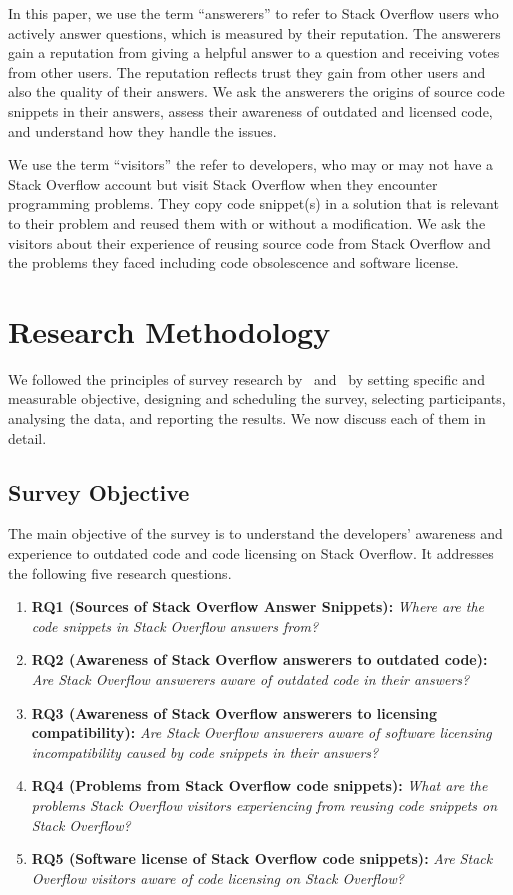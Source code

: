 \documentclass{svjour3}                     %
\begin{document}
In this paper, we use the term ``answerers'' to refer to Stack Overflow users
who actively answer questions, which is measured by their reputation. The
answerers gain a reputation from giving a helpful answer to a question and
receiving votes from other users. The reputation reflects trust they gain from
other users and also the quality of their answers. We ask the answerers the
origins of source code snippets in their answers, assess their awareness of
outdated and licensed code, and understand how they handle the issues.

We use the term ``visitors'' the refer to developers, who may or may not have a
Stack Overflow account but visit Stack Overflow when they encounter programming
problems. They copy code snippet(s) in a solution that is relevant to their
problem and reused them with or without a modification. We ask the visitors
about their experience of reusing source code from Stack Overflow and the
problems they faced including code obsolescence and software license.

\section{Research Methodology}
We followed the principles of survey research by~\cite{Pfleeger2001}
and~\cite{Kitchenham2002} by setting specific and measurable objective,
designing and scheduling the survey, selecting participants, analysing the data,
and reporting the results. We now discuss each of them in detail.

\subsection{Survey Objective}
The main objective of the survey is to understand the developers' awareness and
experience to outdated code and code licensing on Stack Overflow. It addresses
the following five research questions.

\begin{enumerate}
	\item \textbf{RQ1 (Sources of Stack Overflow Answer Snippets):} \textit{Where are the code snippets in Stack Overflow answers from?}
	\item \textbf{RQ2 (Awareness of Stack Overflow answerers to outdated code):} \textit{Are Stack Overflow answerers aware of outdated code in their answers?}
	\item \textbf{RQ3 (Awareness of Stack Overflow answerers to licensing compatibility):} \textit{Are Stack Overflow answerers aware of software licensing
		incompatibility caused by code snippets in their answers?}
	\item \textbf{RQ4 (Problems from Stack Overflow code snippets):} \textit{What are the problems Stack Overflow visitors experiencing from reusing code snippets on Stack Overflow?}
	\item \textbf{RQ5 (Software license of Stack Overflow code
            snippets):} \textit{Are Stack Overflow visitors aware of code licensing on Stack Overflow?}
\end{enumerate}
\end{document}
